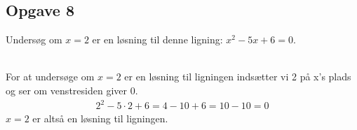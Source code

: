 \subsection{Opgave 8}

Undersøg om $x = 2$ er en løsning til denne ligning: $x^2 -5x + 6 = 0$.\\\\

\ans

For at undersøge om $x = 2$ er en løsning til ligningen indsætter vi 2 på x's plads og ser om venstresiden giver 0.
\begin{align*}
    2^2 -5\cdot 2 + 6 = 4 - 10 + 6 = 10 - 10 = 0
\end{align*}
$x = 2$ er altså en løsning til ligningen. 